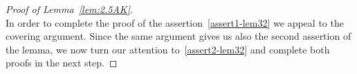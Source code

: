 \documentclass[11pt,a4paper,reqno]{amsart}
\theoremstyle{definition}
\def\vint{\mathop{\mathchoice%
          {\setbox0\hbox{$\displaystyle\intop$}\kern 0.22\wd0%
           \vcenter{\hrule width 0.6\wd0}\kern -0.82\wd0}%
          {\setbox0\hbox{$\textstyle\intop$}\kern 0.2\wd0%
           \vcenter{\hrule width 0.6\wd0}\kern -0.8\wd0}%
          {\setbox0\hbox{$\scriptstyle\intop$}\kern 0.2\wd0%
           \vcenter{\hrule width 0.6\wd0}\kern -0.8\wd0}%
          {\setbox0\hbox{$\scriptscriptstyle\intop$}\kern 0.2\wd0%
           \vcenter{\hrule width 0.6\wd0}\kern -0.8\wd0}}%
          \mathopen{}\int}
\renewcommand{\a}{\operatorname{a}}
\newcommand{\ud}{\mathrm {d}}
\newcommand{\blue}{\color{blau}}
\newcommand{\red}{\color{red}}
\newcommand{\kom}[1]{}
\renewcommand{\kom}[1]{{\bf \blue /#1/}}
\newcounter{komcounter}
\numberwithin{komcounter}{section}
\newcommand{\komT}[1]{{\bf \blue [\refstepcounter{komcounter}\thekomcounter (by T): #1]}}
\newcommand{\komI}[1]{{\bf \red [\refstepcounter{komcounter}\thekomcounter (by I): #1]}}
\begin{document}
\begin{proof}[Proof of Lemma~\ref{lem:2.5AK}]
\begin{equation}
\end{equation}
 In order to complete the proof of the assertion~\eqref{assert1-lem32} we appeal to the covering argument. Since the same argument gives us also the second assertion of the lemma, we now turn our attention to~\eqref{assert2-lem32} and complete both proofs in the next step. 
%	

\end{proof}
\end{document}
